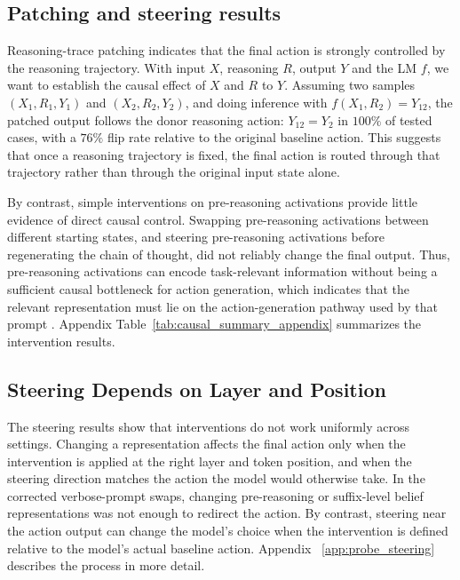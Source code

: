 \documentclass[10pt,twocolumn]{article}
\begin{document}
\subsection{Patching and steering results}

Reasoning-trace patching indicates that the final action is strongly
controlled by the reasoning trajectory. With input $X$, reasoning $R$, output $Y$ and the LM $f$, we want to establish the causal effect of $X$ and $R$ to $Y$. Assuming two samples $(X_1, R_1, Y_1)$ and $(X_2, R_2, Y_2)$, and doing inference with
$f(X_1,R_2)=Y_{12}$, the patched output follows the donor reasoning action:
$Y_{12}=Y_2$ in $100\%$ of tested cases, with a $76\%$ flip rate relative to
the original baseline action. This suggests that once a reasoning trajectory
is fixed, the final action is routed through that trajectory rather than
through the original input state alone.

By contrast, simple interventions on pre-reasoning activations provide little
evidence of direct causal control. Swapping pre-reasoning activations between
different starting states, and steering pre-reasoning activations before
regenerating the chain of thought, did not reliably change the final output.
Thus, pre-reasoning activations can encode task-relevant information without
being a sufficient causal bottleneck for action generation, which indicates
that the relevant representation must lie on the action-generation pathway used
by that prompt \cite{kramar2024atpstar}. Appendix Table~\ref{tab:causal_summary_appendix} summarizes the
intervention results.

\subsection{Steering Depends on Layer and Position}

The steering results show that interventions do not work uniformly across
settings. Changing a representation affects the final action only when the
intervention is applied at the right layer and token position, and when the
steering direction matches the action the model would otherwise take. In the
corrected verbose-prompt swaps, changing pre-reasoning or suffix-level belief
representations was not enough to redirect the action. By contrast, steering
near the action output can change the model's choice when the intervention is
defined relative to the model's actual baseline action. Appendix ~\ref{app:probe_steering} describes the process in more detail. 
\end{document}
